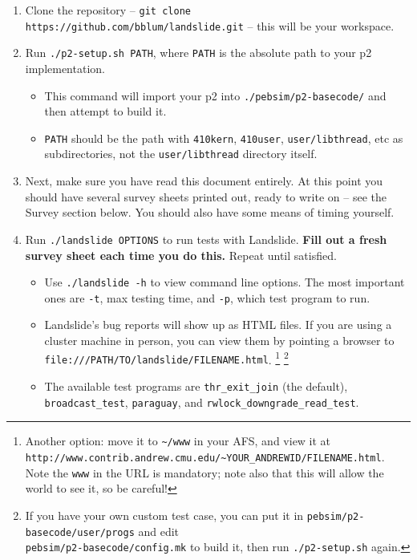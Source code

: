 \documentclass{article}
\begin{document}
\begin{enumerate}
	\item Clone the repository -- {\tt git clone https://github.com/bblum/landslide.git} -- this will be your workspace.
	\item Run {\tt ./p2-setup.sh PATH}, where {\tt PATH} is the absolute path to your p2 implementation.
		\begin{itemize}
			\item This command will import your p2 into {\tt ./pebsim/p2-basecode/} and then attempt to build it.
			\item {\tt PATH} should be the path with {\tt 410kern}, {\tt 410user}, {\tt user/libthread}, etc as subdirectories, not the {\tt user/libthread} directory itself.
		\end{itemize}
	\item Next, make sure you have read this document entirely. At this point you should have several survey sheets printed out, ready to write on -- see the Survey section below. You should also have some means of timing yourself.
	\item Run {\tt ./landslide OPTIONS} to run tests with Landslide. {\bf Fill out a fresh survey sheet each time you do this.} Repeat until satisfied.
		\begin{itemize}
			\item Use {\tt ./landslide -h} to view command line options. The most important ones are {\tt -t}, max testing time, and {\tt -p}, which test program to run.
			\item Landslide's bug reports will show up as HTML files. If you are using a cluster machine in person, you can view them by pointing a browser to {\tt file:///PATH/TO/landslide/FILENAME.html}.
				\footnote{Another option: move it to {\tt \textasciitilde/www} in your AFS, and view it at {\tt http://www.contrib.andrew.cmu.edu/\textasciitilde{}YOUR\_ANDREWID/FILENAME.html}. Note the {\tt www} in the URL is mandatory; note also that this will allow the world to see it, so be careful!}
				\footnote{If you have your own custom test case, you can put it in {\tt pebsim/p2-basecode/user/progs} and edit \\ {\tt pebsim/p2-basecode/config.mk} to build it, then run {\tt ./p2-setup.sh} again.}
			\item The available test programs are {\tt thr\_exit\_join} (the default), {\tt broadcast\_test}, {\tt paraguay}, and {\tt rwlock\_downgrade\_read\_test}.

\end{itemize}
\end{enumerate}
\end{document}
